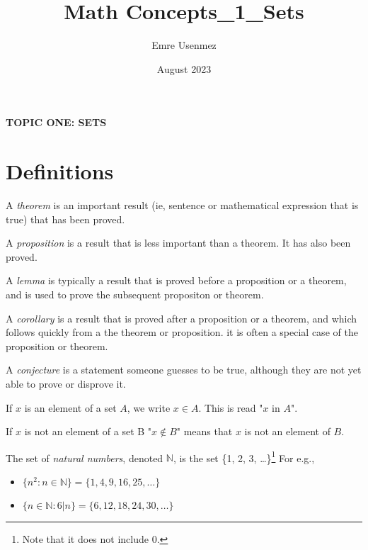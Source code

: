 \documentclass{amsart} %
\title{Math Concepts_1_Sets}
\author{Emre Usenmez}
\date{August 2023}
\theoremstyle{definition} %
\theoremstyle{definition}
\theoremstyle{remark} %
\begin{document}


\begin{center}
      \textbf{TOPIC ONE: SETS}
\end{center}


\section{\textbf{Definitions}}


\noindent {} \quad A \emph{theorem} is an important result (ie, sentence or mathematical expression that is true) that has been proved. %

\medskip
\noindent {} \quad A \emph{proposition} is a result that is less important than a theorem. It has also been proved.


\medskip
\noindent {} \quad A \emph{lemma} is typically a result that is proved before a proposition or a theorem, and is used to prove the subsequent propositon or theorem.


\medskip
\noindent {} \quad A \emph{corollary} is a result that is proved after a proposition or a theorem, and which follows quickly from a the theorem or proposition. it is often a special case of the proposition or theorem.


\medskip
\noindent {} \quad A \emph{conjecture} is a statement someone guesses to be true, although they are not yet able to prove or disprove it.


\medskip
\noindent \boxed{\in} \quad If $x$ is an element of a set $A$, we write $x \in A$. This is read "$x$ in $A$".


\medskip
\noindent \boxed{\not\in} \quad If $x$ is not an element of a set B "$x \not\in B$" means that $x$ is not an element of $B$.


\medskip
\noindent {} \quad The set of \emph{natural numbers}, denoted $\mathbb{N}$, is the set \{1, 2, 3, \dots\}\footnote{Note that it does not include 0.} For e.g.,
    \begin{itemize}
          \item $\{n^2:n \in \mathbb{N} \} = \{1, 4, 9, 16, 25, \dots\}$
          \item $\{n \in \mathbb{N} : 6|n\} = \{6, 12, 18, 24, 30, \dots\}$
    \end{itemize}
\end{document}
